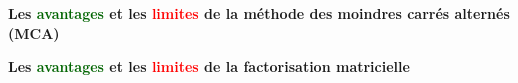 \begin{frame}{\PartieI}
    \begin{center}
        \textbf{\large{Les \textcolor{darkgreen}{avantages} et les \textcolor{red}{limites} de la méthode des moindres carrés alternés (MCA)}}
    \end{center}
\end{frame}

\begin{frame}{\PartieI}
    \begin{center}
        \textbf{\large{Les \textcolor{darkgreen}{avantages} et les \textcolor{red}{limites} de la factorisation matricielle}}
    \end{center}
\end{frame}